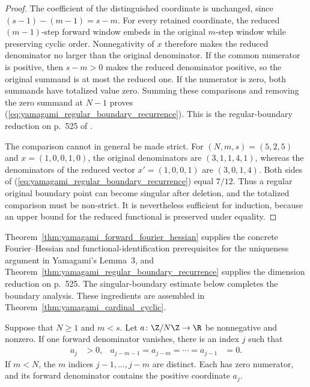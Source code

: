 \begin{proof}
    \leanok
    The coefficient of the distinguished coordinate is unchanged, since
    $(s-1)-(m-1)=s-m$.  For every retained coordinate, the reduced
    $(m-1)$-step forward window embeds in the original $m$-step window while
    preserving cyclic order.  Nonnegativity of $x$ therefore makes the
    reduced denominator no larger than the original denominator.  If the
    common numerator is positive, then $s-m>0$ makes the reduced denominator
    positive, so the original summand is at most the reduced one.  If the
    numerator is zero, both summands have totalized value zero.  Summing these
    comparisons and removing the zero summand at $N-1$ proves
    (\ref{eq:yamagami_regular_boundary_recurrence}).  This is the
    regular-boundary reduction on p.~525 of
    \cite{Yamagami1993Cyclic}.

    The comparison cannot in general be made strict.  For
    $(N,m,s)=(5,2,5)$ and $x=(1,0,0,1,0)$, the original denominators are
    $(3,1,1,4,1)$, whereas the denominators of the reduced vector
    $x'=(1,0,0,1)$ are $(3,0,1,4)$.  Both sides of
    (\ref{eq:yamagami_regular_boundary_recurrence}) equal $7/12$.  Thus a
    regular original boundary point can become singular after deletion, and
    the totalized comparison must be non-strict.  It is nevertheless
    sufficient for induction, because an upper bound for the reduced
    functional is preserved under equality.
\end{proof}

Theorem~\ref{thm:yamagami_forward_fourier_hessian} supplies the concrete
Fourier--Hessian and functional-identification prerequisites for the
uniqueness argument in Yamagami's Lemma~3, and
Theorem~\ref{thm:yamagami_regular_boundary_recurrence} supplies the
dimension reduction on p.~525. The singular-boundary estimate below completes
the boundary analysis. These ingredients are assembled in
Theorem~\ref{thm:yamagami_cardinal_cyclic}.

\begin{lemma}
    \label{lem:yamagami_singular_zero_run}
    \leanok
    Suppose that $N\ge1$ and $m<s$.  Let $a\colon\Z/N\Z\to\R$ be
    nonnegative and nonzero.  If one forward denominator vanishes, there is
    an index $j$ such that
    \begin{align}
        a_j&>0,
        &a_{j-m-1}=a_{j-m}=\cdots=a_{j-1}&=0.
    \end{align}
    If $m<N$, the $m$ indices $j-1,\ldots,j-m$ are distinct.  Each has zero
    numerator, and its forward denominator contains the positive coordinate
    $a_j$.
\end{lemma}


